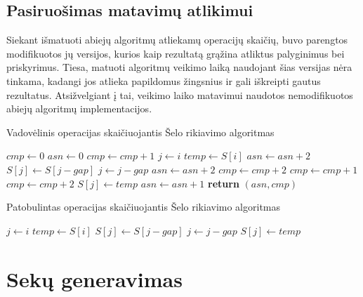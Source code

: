 \documentclass{VUMIFInfKursinis}
\begin{document}
\subsection{Pasiruošimas matavimų atlikimui}
Siekant išmatuoti abiejų algoritmų atliekamų operacijų skaičių, buvo parengtos modifikuotos jų
versijos, kurios kaip rezultatą grąžina atliktus palyginimus bei priskyrimus.
Tiesa, matuoti algoritmų veikimo laiką naudojant šias versijas nėra tinkama,
kadangi jos atlieka papildomus žingsnius ir gali iškreipti gautus rezultatus.
Atsižvelgiant į tai, veikimo laiko matavimui naudotos nemodifikuotos abiejų algoritmų implementacijos. 

\begin{algorithm}
  \caption{Vadovėlinis operacijas skaičiuojantis Šelo rikiavimo algoritmas}\label{css_reported}
  \begin{algorithmic}[1]
  \State $cmp\gets 0$
  \State $asn\gets 0$
      \State $cmp\gets cmp+1$
      \State $j\gets i$
      \State $temp\gets S[i]$
      \State $asn\gets asn+2$
        \State $S[j]\gets S[j - gap]$
        \State $j\gets j-gap$
        \State $asn\gets asn+2$
        \State $cmp\gets cmp+2$
      \EndWhile
        \State $cmp\gets cmp+1$
      \Else
        \State $cmp\gets cmp+2$
      \EndIf
      \State $S[j]\gets temp$
      \State $asn\gets asn+1$
    \EndFor
  \EndFor
  \State \textbf{return} $(asn, cmp)$
  \end{algorithmic}
\end{algorithm}

\begin{algorithm}
  \caption{Patobulintas operacijas skaičiuojantis Šelo rikiavimo algoritmas}\label{iss_reported}
  \begin{algorithmic}[1]
        \State $j\gets i$
        \State $temp\gets S[i]$
        \Repeat
          \State $S[j]\gets S[j - gap]$
          \State $j\gets j-gap$
        \State $S[j]\gets temp$
      \EndIf
    \EndFor
  \EndFor
  \end{algorithmic}
\end{algorithm}

\section{Sekų generavimas}
\end{document}
